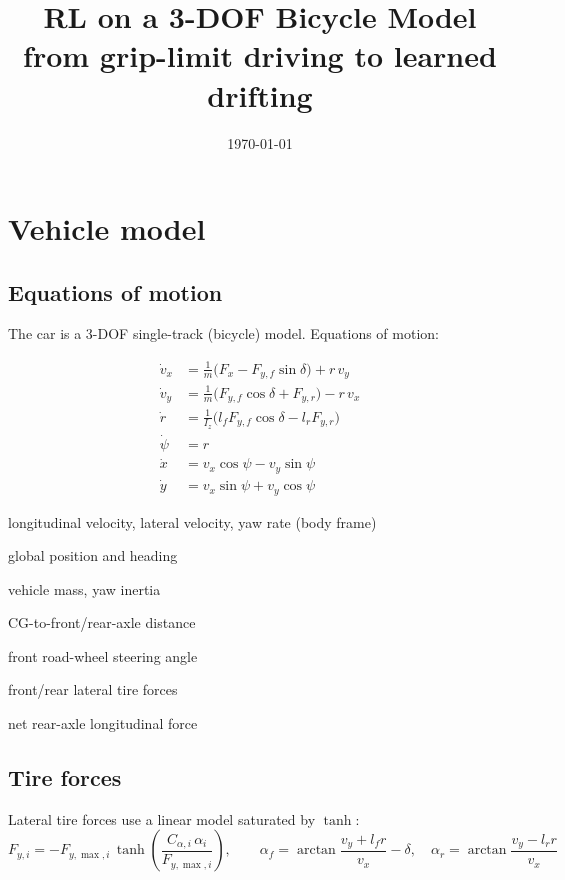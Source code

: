 \documentclass[11pt]{article}
\title{RL on a 3-DOF Bicycle Model\\
\large from grip-limit driving to learned drifting}
\author{}
\date{\today}
\begin{document}
\maketitle

\section{Vehicle model}

\subsection{Equations of motion}
The car is a 3-DOF single-track (bicycle) model. Equations of motion:

\begin{align}
\dot{v}_x &= \tfrac{1}{m}\bigl(F_x - F_{y,f}\sin\delta\bigr) + r\,v_y \\
\dot{v}_y &= \tfrac{1}{m}\bigl(F_{y,f}\cos\delta + F_{y,r}\bigr) - r\,v_x \\
\dot{r}   &= \tfrac{1}{I_z}\bigl(l_f F_{y,f}\cos\delta - l_r F_{y,r}\bigr) \\
\dot{\psi} &= r \\
\dot{x}   &= v_x\cos\psi - v_y\sin\psi \\
\dot{y}   &= v_x\sin\psi + v_y\cos\psi
\end{align}

\begin{description}[nosep, itemsep=2pt]
\item[$v_x,\;v_y,\;r$] longitudinal velocity, lateral velocity, yaw rate (body frame)
\item[$x,\;y,\;\psi$] global position and heading
\item[$m,\;I_z$] vehicle mass, yaw inertia
\item[$l_f,\;l_r$] CG-to-front/rear-axle distance
\item[$\delta$] front road-wheel steering angle
\item[$F_{y,f},\;F_{y,r}$] front/rear lateral tire forces
\item[$F_x$] net rear-axle longitudinal force
\end{description}

\subsection{Tire forces}
Lateral tire forces use a linear model saturated by $\tanh$:
\begin{equation}
F_{y,i} = -F_{y,\max,i}\,\tanh\!\left(\frac{C_{\alpha,i}\,\alpha_i}{F_{y,\max,i}}\right),
\qquad
\alpha_f = \arctan\!\frac{v_y + l_f r}{v_x} - \delta,
\quad
\alpha_r = \arctan\!\frac{v_y - l_r r}{v_x}
\end{equation}
\end{document}
